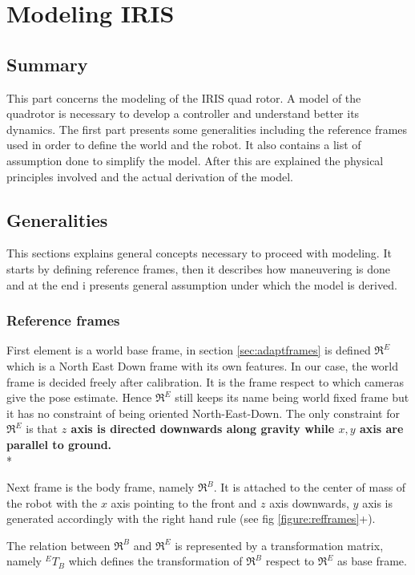 
\chapter{Modeling IRIS}
\label{chap:fourth
}
\ifpdf
    \graphicspath{{Chapter4/Figures/PNG/}{Chapter4/Figures/PDF/}{Chapter4/Figures/}}
\else
    \graphicspath{{Chapter4/Figures/EPS/}{Chapter4/Figures/}}
\fi

\section*{Summary}

This part concerns the modeling of the IRIS quad rotor. A model of the quadrotor is necessary to develop a controller and understand better its dynamics. The first part presents some generalities including the reference frames used in order to define the world and the robot. It also contains a list of assumption done to simplify the model. After this  are explained the physical principles involved and the actual derivation of the model.

\section{Generalities}

This sections explains general concepts necessary to proceed with modeling. It starts by defining reference frames, then it describes how maneuvering is done and at the end i presents general assumption under which the model is derived.

\subsection{Reference frames}
\label{sec:refframes}
First element is a world base frame, in section \ref{sec:adaptframes} is defined $\Re^E$ which is a North East Down frame with its own features. In our case, the world frame is decided freely after calibration. It is the frame respect to which cameras give the pose estimate. Hence $\Re^E$ still keeps its name being world fixed frame but it has no constraint of being oriented North-East-Down. The only constraint for $\Re^E$ is that \textbf{$z$ axis is directed downwards along gravity while $x , y$ axis are parallel to ground.} \\*

\noindent
Next frame is the body frame, namely $\Re^B$. It is attached to the center of mass of the robot with the $x$ axis pointing to the front and $z$ axis downwards, $y$ axis is generated accordingly with the right hand rule (see fig \ref{figure:refframes}+).\par The relation between $\Re^B$ and $\Re^E$ is represented by a transformation matrix, namely ${}^ET_B$ which defines the transformation of $\Re^B$ respect to $\Re^E$ as base frame.

